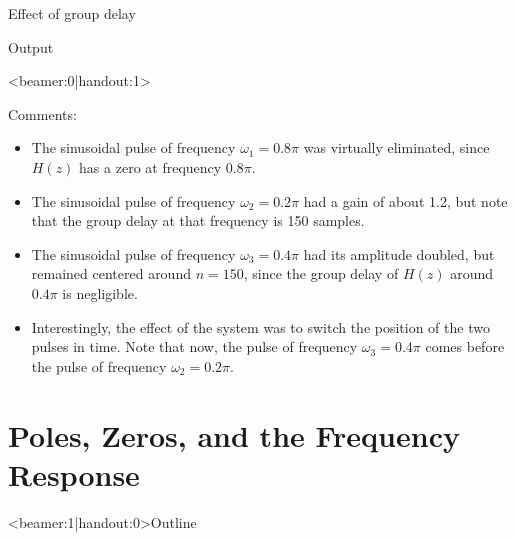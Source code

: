 \documentclass[10pt, handout]{beamer}
\begin{document}
\begin{frame}{Effect of group delay}
\begin{block}{Output}
\begin{center}
		\end{center}	
	\end{block}
\end{frame}

\begin{frame}<beamer:0|handout:1>

Comments:
\begin{itemize}
	\item The sinusoidal pulse of frequency $\omega_1 = 0.8\pi$ was virtually eliminated, since $H(z)$ has a zero at frequency $0.8\pi$.
	\item The sinusoidal pulse of frequency $\omega_2 = 0.2\pi$ had a gain of about 1.2, but note that the group delay at that frequency is 150 samples.
	\item The sinusoidal pulse of frequency $\omega_3 = 0.4\pi$ had its amplitude doubled, but remained centered around $n = 150$, since the group delay of $H(z)$ around $0.4\pi$ is negligible.
	\item Interestingly, the effect of the system was to switch the position of the two pulses in time. Note that now, the pulse of frequency $\omega_3 = 0.4\pi$ comes before the pulse of frequency $\omega_2 = 0.2\pi$.
\end{itemize}

\end{frame}


%
\section{Poles, Zeros, and the Frequency Response}
\begin{frame}<beamer:1|handout:0>{Outline}
\tableofcontents[currentsection]
\end{frame}
\end{document}
